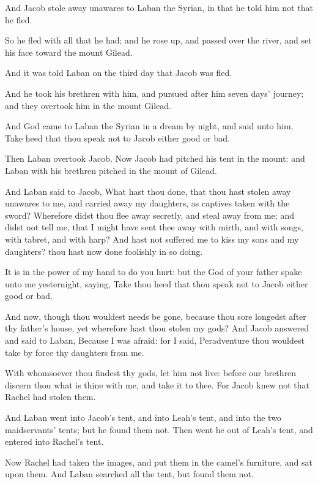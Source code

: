 \verse And Jacob stole away unawares to Laban the Syrian, in that he told him not that he fled.

\verse So he fled with all that he had; and he rose up, and passed over the river, and set his face toward the mount Gilead.

\verse And it was told Laban on the third day that Jacob was fled.

\verse And he took his brethren with him, and pursued after him seven days' journey; and they overtook him in the mount Gilead.

\verse And God came to Laban the Syrian in a dream by night, and said unto him, Take heed that thou speak not to Jacob either good or bad.

\verse Then Laban overtook Jacob. Now Jacob had pitched his tent in the mount: and Laban with his brethren pitched in the mount of Gilead.

\verse And Laban said to Jacob, What hast thou done, that thou hast stolen away unawares to me, and carried away my daughters, as captives taken with the sword?  \verse Wherefore didst thou flee away secretly, and steal away from me; and didst not tell me, that I might have sent thee away with mirth, and with songs, with tabret, and with harp?  \verse And hast not suffered me to kiss my sons and my daughters? thou hast now done foolishly in so doing.

\verse It is in the power of my hand to do you hurt: but the God of your father spake unto me yesternight, saying, Take thou heed that thou speak not to Jacob either good or bad.

\verse And now, though thou wouldest needs be gone, because thou sore longedst after thy father's house, yet wherefore hast thou stolen my gods?  \verse And Jacob answered and said to Laban, Because I was afraid: for I said, Peradventure thou wouldest take by force thy daughters from me.

\verse With whomsoever thou findest thy gods, let him not live: before our brethren discern thou what is thine with me, and take it to thee.  For Jacob knew not that Rachel had stolen them.

\verse And Laban went into Jacob's tent, and into Leah's tent, and into the two maidservants' tents; but he found them not. Then went he out of Leah's tent, and entered into Rachel's tent.

\verse Now Rachel had taken the images, and put them in the camel's furniture, and sat upon them. And Laban searched all the tent, but found them not.


